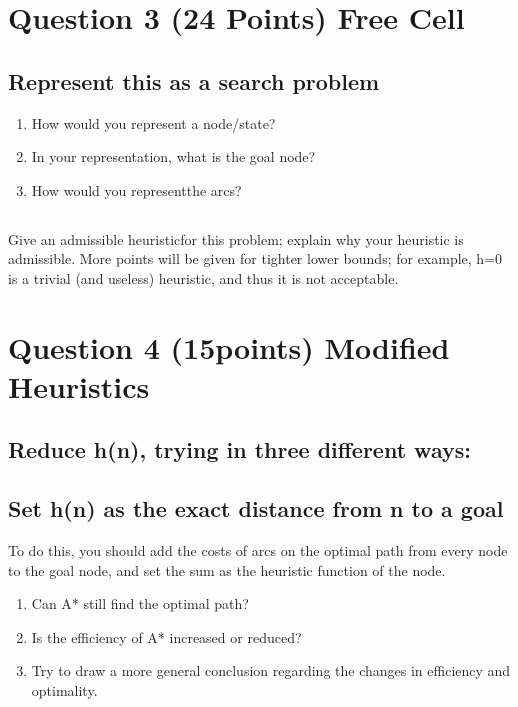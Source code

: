 \documentclass{article}
\begin{document}
\clearpage
\section{Question 3 (24 Points) Free Cell }

\subsection{Represent this as a search problem}
\begin{enumerate}[label=(\alph*)]
    \item How would you represent a node/state?
    \item In your representation, what is the goal node?
    \item How would you representthe arcs?
\end{enumerate}

\subsection{}
Give  an  admissible  heuristicfor  this  problem;  explain  why  your  heuristic  is  admissible. More points will be given for tighter lower bounds; for example, h=0 is a trivial (and useless) heuristic, and thus it is not acceptable.


\clearpage
\section{Question 4 (15points) Modified Heuristics}

\subsection{Reduce h(n), trying in three different ways:}

\subsection{Set h(n) as the exact distance from n to a goal}
To do this, you should add the costs of arcs on the optimal path from every node to the goal node, and set the sum as the heuristic function of the node. 
\begin{enumerate}[label=(\alph*)]
    \item Can A* still find the optimal path? 
    \item Is the efficiency of A* increased or reduced? 
    \item Try to draw a more general conclusion regarding the changes in efficiency and optimality. 
\end{enumerate}
\end{document}
